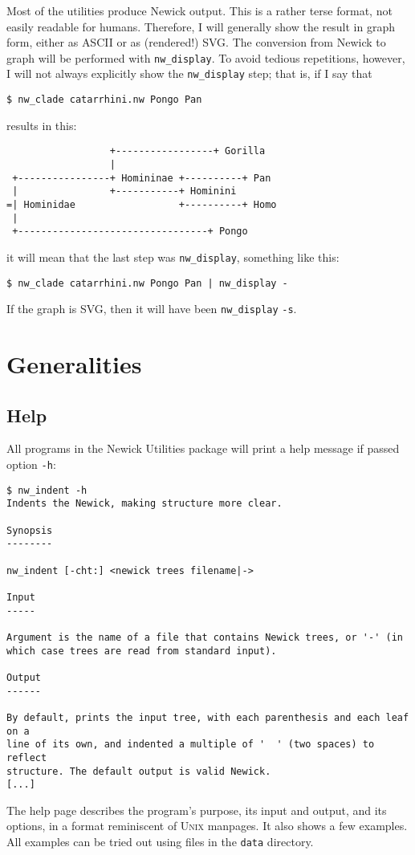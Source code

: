 \documentclass[a4paper,10pt]{report}
\newcommand{\nutils}{Newick Utilities}
\newcommand{\unix}{\textsc{Unix}}
\newcommand{\ascii}{\textsc{ASCII}}
\newcommand{\svg}{\textsc{SVG}}
\newcommand{\display}{\texttt{nw\_display}}
\begin{document}
Most of the utilities produce Newick output. This is a rather terse format, not easily readable for humans. Therefore, I will generally show the result in graph form, either as \ascii{} or as (rendered!) \svg. The conversion from Newick to graph will be performed with \display{}. To avoid tedious repetitions, however, I will not always explicitly show the \display{} step; that is, if I say that 
\begin{verbatim}
$ nw_clade catarrhini.nw Pongo Pan
\end{verbatim} 
results in this:
\begin{samepage}
\begin{verbatim}
                  +-----------------+ Gorilla     
                  |                               
 +----------------+ Homininae +----------+ Pan    
 |                +-----------+ Hominini          
=| Hominidae                  +----------+ Homo   
 |                                                
 +---------------------------------+ Pongo  
\end{verbatim} 
\end{samepage}
it will mean that the last step was \display{}, something like this:
\begin{verbatim}
$ nw_clade catarrhini.nw Pongo Pan | nw_display -
\end{verbatim}
If the graph is \svg, then it will have been \display{} \verb+-s+.

\chapter{Generalities}
\label{chap_general}

\section{Help}
\label{sect_help}

All programs in the \nutils{} package will print a help message if passed option \texttt{-h}:

\begin{samepage}
\begin{verbatim}
$ nw_indent -h
Indents the Newick, making structure more clear.

Synopsis
--------

nw_indent [-cht:] <newick trees filename|->

Input
-----

Argument is the name of a file that contains Newick trees, or '-' (in
which case trees are read from standard input).

Output
------

By default, prints the input tree, with each parenthesis and each leaf on a
line of its own, and indented a multiple of '  ' (two spaces) to reflect
structure. The default output is valid Newick.
[...]
\end{verbatim}
\end{samepage}
The help page describes the program's purpose, its input and output, and its options, in a format reminiscent of \unix{} manpages. It also shows a few examples. All examples can be tried out using files in the \texttt{data} directory.
\end{document}
